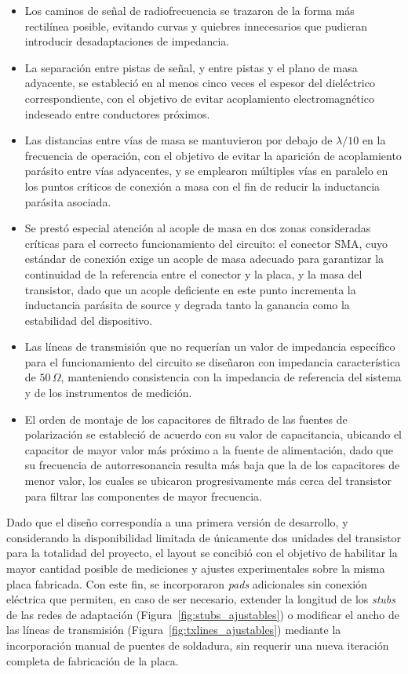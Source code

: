 \begin{itemize}
    \item Los caminos de señal de radiofrecuencia se trazaron de la forma más rectilínea posible, evitando curvas y quiebres innecesarios que pudieran introducir desadaptaciones de impedancia.
    \item La separación entre pistas de señal, y entre pistas y el plano de masa adyacente, se estableció en al menos cinco veces el espesor del dieléctrico correspondiente, con el objetivo de evitar acoplamiento electromagnético indeseado entre conductores próximos.
    \item Las distancias entre vías de masa se mantuvieron por debajo de $\lambda/10$ en la frecuencia de operación, con el objetivo de evitar la aparición de acoplamiento parásito entre vías adyacentes, y se emplearon múltiples vías en paralelo en los puntos críticos de conexión a masa con el fin de reducir la inductancia parásita asociada.
    \item Se prestó especial atención al acople de masa en dos zonas consideradas críticas para el correcto funcionamiento del circuito: el conector SMA, cuyo estándar de conexión exige un acople de masa adecuado para garantizar la continuidad de la referencia entre el conector y la placa, y la masa del transistor, dado que un acople deficiente en este punto incrementa la inductancia parásita de source y degrada tanto la ganancia como la estabilidad del dispositivo.
    \item Las líneas de transmisión que no requerían un valor de impedancia específico para el funcionamiento del circuito se diseñaron con impedancia característica de $50\,\Omega$, manteniendo consistencia con la impedancia de referencia del sistema y de los instrumentos de medición.
    \item El orden de montaje de los capacitores de filtrado de las fuentes de polarización se estableció de acuerdo con su valor de capacitancia, ubicando el capacitor de mayor valor más próximo a la fuente de alimentación, dado que su frecuencia de autorresonancia resulta más baja que la de los capacitores de menor valor, los cuales se ubicaron progresivamente más cerca del transistor para filtrar las componentes de mayor frecuencia.
\end{itemize}

Dado que el diseño correspondía a una primera versión de desarrollo, y considerando la disponibilidad limitada de únicamente dos unidades del transistor para la totalidad del proyecto, el layout se concibió con el objetivo de habilitar la mayor cantidad posible de mediciones y ajustes experimentales sobre la misma placa fabricada. Con este fin, se incorporaron \textit{pads} adicionales sin conexión eléctrica que permiten, en caso de ser necesario, extender la longitud de los \textit{stubs} de las redes de adaptación (Figura~\ref{fig:stubs_ajustables}) o modificar el ancho de las líneas de transmisión (Figura~\ref{fig:txlines_ajustables}) mediante la incorporación manual de puentes de soldadura, sin requerir una nueva iteración completa de fabricación de la placa.

